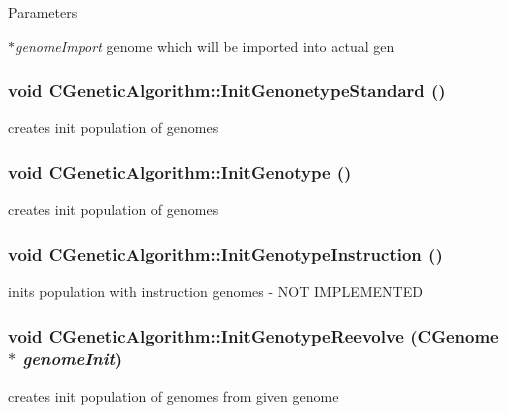 \begin{DoxyParams}{Parameters}
\item[{\em $\ast$genomeImport}]genome which will be imported into actual gen \end{DoxyParams}
\hypertarget{classCGeneticAlgorithm_a0354c0ccdc8b9ec809a0561767172165}{
\subsubsection[{InitGenonetypeStandard}]{\setlength{\rightskip}{0pt plus 5cm}void CGeneticAlgorithm::InitGenonetypeStandard ()}}
\label{classCGeneticAlgorithm_a0354c0ccdc8b9ec809a0561767172165}
creates init population of genomes \hypertarget{classCGeneticAlgorithm_a9632fcef92f6ec52112f971cb5119bc2}{
\subsubsection[{InitGenotype}]{\setlength{\rightskip}{0pt plus 5cm}void CGeneticAlgorithm::InitGenotype ()}}
\label{classCGeneticAlgorithm_a9632fcef92f6ec52112f971cb5119bc2}
creates init population of genomes \hypertarget{classCGeneticAlgorithm_a9910ee23c78afc77e960320026439291}{
\subsubsection[{InitGenotypeInstruction}]{\setlength{\rightskip}{0pt plus 5cm}void CGeneticAlgorithm::InitGenotypeInstruction ()}}
\label{classCGeneticAlgorithm_a9910ee23c78afc77e960320026439291}
inits population with instruction genomes -\/ NOT IMPLEMENTED \hypertarget{classCGeneticAlgorithm_a239027b6bfc2af7443d73645479ec293}{
\subsubsection[{InitGenotypeReevolve}]{\setlength{\rightskip}{0pt plus 5cm}void CGeneticAlgorithm::InitGenotypeReevolve ({\bf CGenome} $\ast$ {\em genomeInit})}}
\label{classCGeneticAlgorithm_a239027b6bfc2af7443d73645479ec293}
creates init population of genomes from given genome


